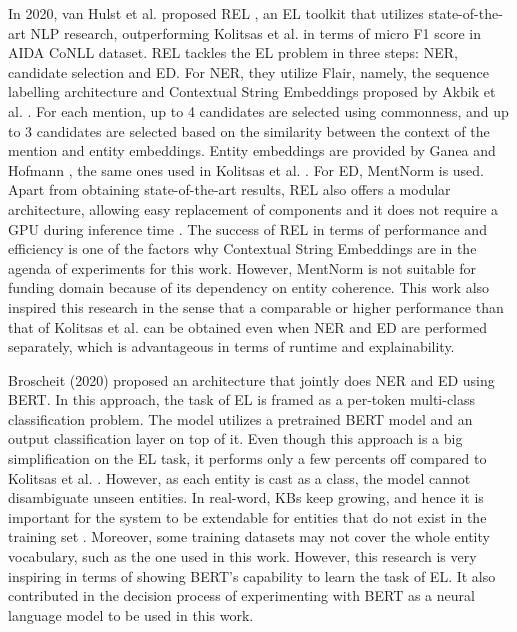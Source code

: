 \documentclass{report}
\theoremstyle{definition}
\theoremstyle{remark}
\begin{document}
In 2020, van Hulst et al. proposed REL \cite{REL}, an EL toolkit that utilizes state-of-the-art NLP research, outperforming Kolitsas et al. \cite{kolitsas} in terms of micro F1 score in AIDA CoNLL dataset. REL tackles the EL problem in three steps: NER, candidate selection and ED. For NER, they utilize Flair, namely, the sequence labelling architecture and Contextual String Embeddings proposed by Akbik et al. \cite{flairpaper}. For each mention, up to 4 candidates are selected using commonness, and up to 3 candidates are selected based on the similarity between the context of the mention and entity embeddings. Entity embeddings are provided by Ganea and Hofmann \cite{kolitsasEmbed}, the same ones used in Kolitsas et al. \cite{kolitsas}. For ED, MentNorm is used. Apart from obtaining state-of-the-art results, REL also offers a modular architecture, allowing easy replacement of components and it does not require a GPU during inference time \cite{REL}. The success of REL in terms of performance and efficiency is one of the factors why Contextual String Embeddings are in the agenda of experiments for this work. However, MentNorm is not suitable for funding domain because of its dependency on entity coherence. This work also inspired this research in the sense that a comparable or higher performance than that of Kolitsas et al. \cite{kolitsas} can be obtained even when NER and ED are performed separately, which is advantageous in terms of runtime and explainability.

Broscheit (2020) \cite{bertEL} proposed an architecture that jointly does NER and ED using BERT. In this approach, the task of EL is framed as a per-token multi-class classification problem. The model utilizes a pretrained BERT model and an output classification layer on top of it. Even though this approach is a big simplification on the EL task, it performs only a few percents off compared to Kolitsas et al. \cite{kolitsas}.  However, as each entity is cast as a class, the model cannot disambiguate unseen entities. In real-word, KBs keep growing, and hence it is important for the system to be extendable for entities that do not exist in the training set \cite{gupta}. Moreover, some training datasets may not cover the whole entity vocabulary, such as the one used in this work. However, this research is very inspiring in terms of showing BERT's capability to learn the task of EL. It also contributed in the decision process of experimenting with BERT as a neural language model to be used in this work.
\end{document}

